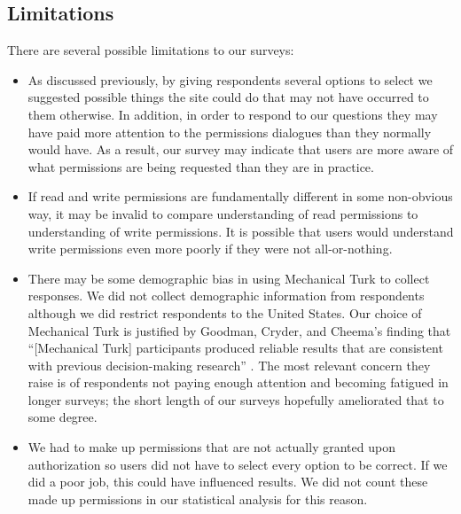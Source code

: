 \documentclass[10pt]{sig-alternate-10pt}
\begin{document}
\subsection{Limitations}
\label{sec:limitations}

There are several possible limitations to our surveys:

\begin{itemize}
  \item As discussed previously, by giving respondents several options to select we suggested possible things the site could do that may not have occurred to them otherwise. In addition, in order to respond to our questions they may have paid more attention to the permissions dialogues than they normally would have. As a result, our survey may indicate that users are more aware of what permissions are being requested than they are in practice.
  \item If read and write permissions are fundamentally different in some non-obvious way, it may be invalid to compare understanding of read permissions to understanding of write permissions. It is possible that users would understand write permissions even more poorly if they were not all-or-nothing.
  \item There may be some demographic bias in using Mechanical Turk to collect responses. We did not collect demographic information from respondents although we did restrict respondents to the United States. Our choice of Mechanical Turk is justified by Goodman, Cryder, and Cheema's finding that ``[Mechanical Turk] participants produced reliable results that are consistent with previous decision-making research'' \cite{mturkreliability}. The most relevant concern they raise is of respondents not paying enough attention and becoming fatigued in longer surveys; the short length of our surveys hopefully ameliorated that to some degree.
  \item We had to make up permissions that are not actually granted upon authorization so users did not have to select every option to be correct. If we did a poor job, this could have influenced results. We did not count these made up permissions in our statistical analysis for this reason.
\end{itemize}



\end{document}
